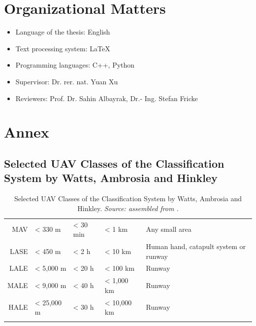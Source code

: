 \chapter{Organizational Matters}
\begin{itemize}
	\item Language of the thesis: English
	\item Text processing system: LaTeX
	\item Programming languages: C++, Python
	\item Supervisor: Dr. rer. nat. Yuan Xu
	\item Reviewers: Prof. Dr. Sahin Albayrak, Dr.- Ing. Stefan Fricke
\end{itemize}

\chapter{Annex}


\section{Selected UAV Classes of the Classification System by Watts, Ambrosia and Hinkley}
\begin{table}[H]
    \caption[Selected UAV Classes of the Classification System by Watts, Ambrosia and Hinkley]{Selected UAV Classes of the Classification System by Watts, Ambrosia and Hinkley. \textit{Source: assembled from \cite{Watts2012}.}}
    \label{tab:UAV_classification_system_by_Watts_Ambrosia_and_Hinkley}
    \centering
    \begin{tabular}{r l l l L{0.3\textwidth}}
    \toprule
     &  &  &  &  \\
    \midrule
    MAV     & < 330 m       & < 30 min  & < 1 km        & Any small area \\
    LASE    & < 450 m       & < 2 h     & < 10 km       & Human hand, catapult system or runway \\
    LALE    & < 5,000 m     & < 20 h    & < 100 km      & Runway \\
    MALE    & < 9,000 m     & < 40 h    & < 1,000 km    & Runway \\
    HALE    & < 25,000 m    & < 30 h    & < 10,000 km   & Runway \\
    \bottomrule\\
    \end{tabular}
\end{table}

